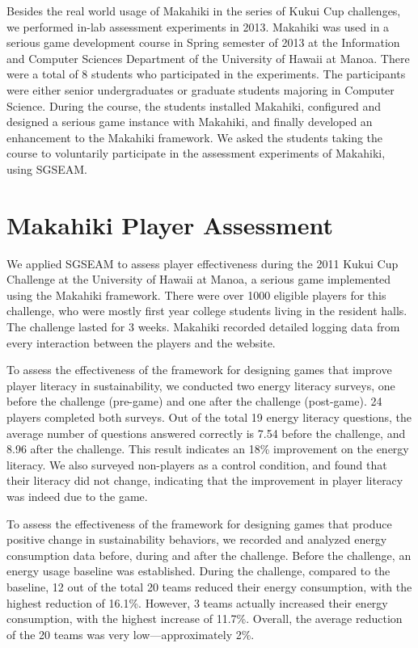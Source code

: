 Besides the real world usage of Makahiki in the series of Kukui Cup challenges, we
performed in-lab assessment experiments in 2013. Makahiki was used in a serious game
development course in Spring semester of 2013 at the Information and Computer Sciences
Department of the University of Hawaii at Manoa. There were a total of 8 students who
participated in the experiments.  The participants were either senior undergraduates or
graduate students majoring in Computer Science. During the course, the students installed
Makahiki, configured and designed a serious game instance with Makahiki, and finally
developed an enhancement to the Makahiki framework. We asked the students taking the
course to voluntarily participate in the assessment experiments of Makahiki, using SGSEAM.

\section{Makahiki Player Assessment}

We applied SGSEAM to assess player effectiveness during the 2011 Kukui Cup Challenge at
the University of Hawaii at Manoa, a serious game implemented using the Makahiki
framework. There were over 1000 eligible players for this challenge, who were mostly first
year college students living in the resident halls. The challenge lasted for 3 weeks.
Makahiki recorded detailed logging data from every interaction between the players and the
website.

To assess the effectiveness of the framework for designing games that improve player literacy in sustainability, we
conducted two energy literacy surveys, one before the challenge (pre-game) and one after
the challenge (post-game). 24 players completed both surveys. Out of the total 19 energy
literacy questions, the average number of questions answered correctly is 7.54 before the
challenge, and 8.96 after the challenge. This result indicates an 18\% improvement on the
energy literacy.  We also surveyed non-players as a control condition, and found that
their literacy did not change, indicating that the improvement in player literacy was
indeed due to the game.

To assess the effectiveness of the framework for designing games that produce positive change in sustainability
behaviors, we recorded and analyzed energy consumption data before, during and after the
challenge.  Before the challenge, an energy usage baseline was established. During the
challenge, compared to the baseline, 12 out of the total 20 teams reduced their energy
consumption, with the highest reduction of 16.1\%. However, 3 teams actually increased
their energy consumption, with the highest increase of 11.7\%. Overall, the average
reduction of the 20 teams was very low---approximately 2\%.

